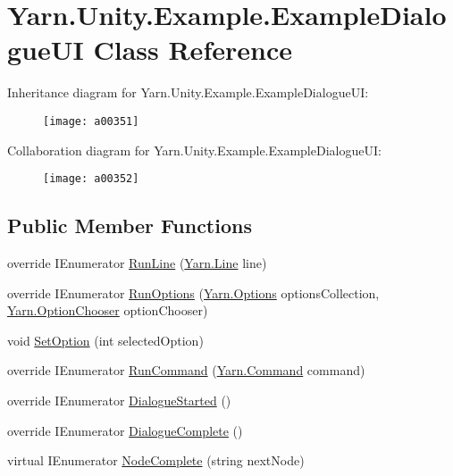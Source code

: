 \hypertarget{a00039}{\section{Yarn.\-Unity.\-Example.\-Example\-Dialogue\-U\-I Class Reference}
\label{a00039}
}


Inheritance diagram for Yarn.\-Unity.\-Example.\-Example\-Dialogue\-U\-I\-:
\nopagebreak
\begin{figure}[H]
\begin{center}
\leavevmode
\texttt{[image: a00351]}
\end{center}
\end{figure}


Collaboration diagram for Yarn.\-Unity.\-Example.\-Example\-Dialogue\-U\-I\-:
\nopagebreak
\begin{figure}[H]
\begin{center}
\leavevmode
\texttt{[image: a00352]}
\end{center}
\end{figure}
\subsection*{Public Member Functions}
\begin{DoxyCompactItemize}
\item 
override I\-Enumerator \hyperlink{a00039_a109aeedc5206dcbc4f629638b7830030}{Run\-Line} (\hyperlink{a00026_a00159}{Yarn.\-Line} line)
\item 
override I\-Enumerator \hyperlink{a00039_aaa93672700a456e66c694636460a58f4}{Run\-Options} (\hyperlink{a00026_a00161}{Yarn.\-Options} options\-Collection, \hyperlink{a00026_a39866cbb03c03a35805d598b5d4ad553}{Yarn.\-Option\-Chooser} option\-Chooser)
\item 
void \hyperlink{a00039_ad1ac5781ded20d2950d8dd3af506df37}{Set\-Option} (int selected\-Option)
\item 
override I\-Enumerator \hyperlink{a00039_a7f84b1e7d3c9c1f7507d143e11ba8075}{Run\-Command} (\hyperlink{a00026_a00156}{Yarn.\-Command} command)
\item 
override I\-Enumerator \hyperlink{a00039_a313283f6c53354b54f25898eb436eba0}{Dialogue\-Started} ()
\item 
override I\-Enumerator \hyperlink{a00039_a1f2a08baacc25aea09af8e60eb5d3eb1}{Dialogue\-Complete} ()
\item 
virtual I\-Enumerator \hyperlink{a00038_a2900548a0704d39d4502a153945f4bef}{Node\-Complete} (string next\-Node)
\end{DoxyCompactItemize}
